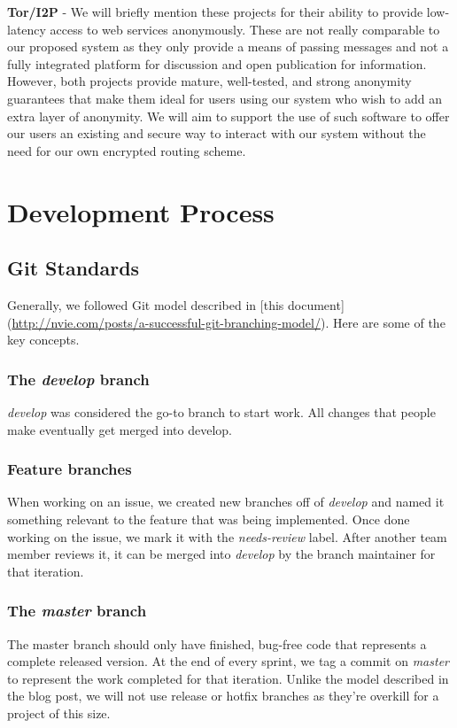 \documentclass[letterpaper,10pt,oneside]{sphinxmanual}
\begin{document}
\textbf{Tor/I2P} - We will briefly mention these projects for their ability to provide low-latency access to web services
anonymously.  These are not really comparable to our proposed system as they only provide a means of passing messages and not a
fully integrated platform for discussion and open publication for information.  However, both projects provide mature,
well-tested, and strong anonymity guarantees that make them ideal for users using our system who wish to add an extra layer of
anonymity.  We will aim to support the use of such software to offer our users an existing and secure way to interact with our
system without the need for our own encrypted routing scheme.


\chapter{Development Process}
\label{process:development-process}\label{process::doc}

\section{Git Standards}
\label{process:git-standards}
Generally, we followed Git model described in {[}this
document{]}(\href{http://nvie.com/posts/a-successful-git-branching-model/}{http://nvie.com/posts/a-successful-git-branching-model/}). Here are some of the key concepts.


\subsection{The \emph{develop} branch}
\label{process:the-develop-branch}
\emph{develop} was considered the go-to branch to start work. All changes that people make eventually get
merged into develop.


\subsection{Feature branches}
\label{process:feature-branches}
When working on an issue, we created new branches off of \emph{develop} and named it something relevant to the feature
that was being implemented. Once done working on the issue, we mark it with the \emph{needs-review} label.
After another team member reviews it, it can be merged into \emph{develop} by the branch maintainer for that iteration.


\subsection{The \emph{master} branch}
\label{process:the-master-branch}
The master branch should only have finished, bug-free code that represents a complete released version. At the
end of every sprint, we tag a commit on \emph{master} to represent the work completed for that iteration.
Unlike the model described in the blog post, we will not use release or hotfix branches as they're overkill
for a project of this size.
\end{document}
